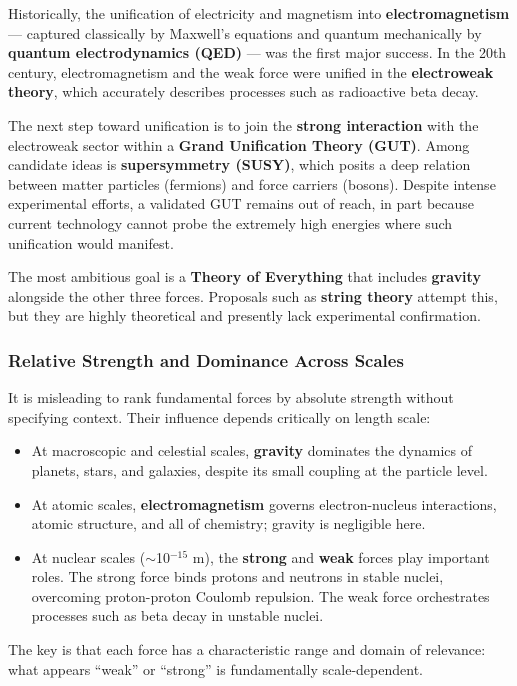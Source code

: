 \documentclass[11pt,a4paper]{article}
\begin{document}
Historically, the unification of electricity and magnetism into \textbf{electromagnetism} --- captured classically by Maxwell's equations and quantum mechanically by \textbf{quantum electrodynamics (QED)} --- was the first major success. In the 20th century, electromagnetism and the weak force were unified in the \textbf{electroweak theory}, which accurately describes processes such as radioactive beta decay.

The next step toward unification is to join the \textbf{strong interaction} with the electroweak sector within a \textbf{Grand Unification Theory (GUT)}. Among candidate ideas is \textbf{supersymmetry (SUSY)}, which posits a deep relation between matter particles (fermions) and force carriers (bosons). Despite intense experimental efforts, a validated GUT remains out of reach, in part because current technology cannot probe the extremely high energies where such unification would manifest.

The most ambitious goal is a \textbf{Theory of Everything} that includes \textbf{gravity} alongside the other three forces. Proposals such as \textbf{string theory} attempt this, but they are highly theoretical and presently lack experimental confirmation.

\subsubsection{Relative Strength and Dominance Across Scales}
It is misleading to rank fundamental forces by absolute strength without specifying context. Their influence depends critically on length scale:

\begin{itemize}
\item At macroscopic and celestial scales, \textbf{gravity} dominates the dynamics of planets, stars, and galaxies, despite its small coupling at the particle level.
\item At atomic scales, \textbf{electromagnetism} governs electron-nucleus interactions, atomic structure, and all of chemistry; gravity is negligible here.
\item At nuclear scales (\ensuremath{\sim}10\ensuremath{{}^{-15}} m), the \textbf{strong} and \textbf{weak} forces play important roles. The strong force binds protons and neutrons in stable nuclei, overcoming proton-proton Coulomb repulsion. The weak force orchestrates processes such as beta decay in unstable nuclei.
\end{itemize}
The key is that each force has a characteristic range and domain of relevance: what appears ``weak'' or ``strong'' is fundamentally scale-dependent.
\end{document}
